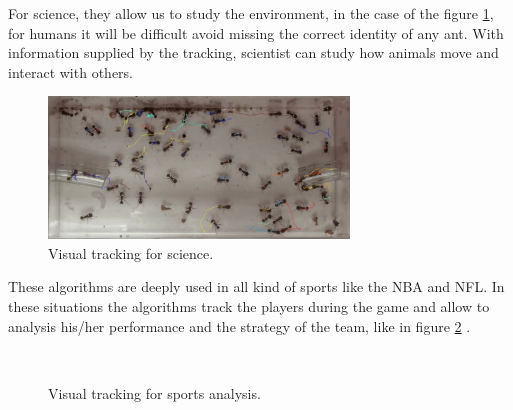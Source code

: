 For science, they allow us to study the environment, in the case of the figure \ref{introTracking2}, for humans it will be difficult avoid missing the correct identity of any ant. With information supplied by the tracking, scientist can study how animals move and interact with others.

\begin{figure}[H]
\centering         
\includegraphics[width=8cm]{aplicaciones/Seleccio_007.png}
\caption{Visual tracking for science.} \label{introTracking2}
\end{figure}

These algorithms are deeply used in all kind of sports like the NBA and NFL. In these situations the algorithms track the players during the game and allow to analysis his/her performance and the strategy of the team, like in figure \ref{introTracking3} .

\begin{figure}[H]
	
\centering

\\


\caption{Visual tracking for sports analysis.}
\label{introTracking3}
\end{figure}

